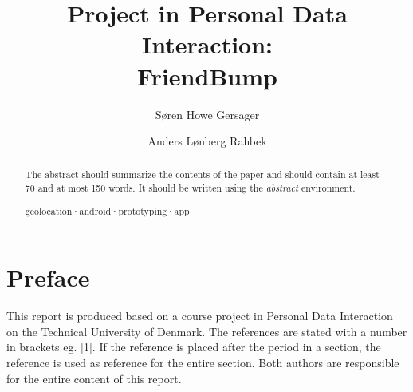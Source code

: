 \documentclass[runningheads,a4paper]{llncs}
\newcommand{\keywords}[1]{\par\addvspace\baselineskip
\noindent\keywordname\enspace\ignorespaces#1}
\begin{document}
\mainmatter  %

\title{Project in Personal Data Interaction:\\FriendBump}


%
%
\author{S\o ren Howe Gersager \and Anders L\o nberg Rahbek}
%


%
%

\maketitle


\begin{abstract}
The abstract should summarize the contents of the paper and should
contain at least 70 and at most 150 words. It should be written using the
\emph{abstract} environment.
\keywords{geolocation·android·prototyping·app}
\end{abstract}


\section*{Preface}
This report is produced based on a course project in Personal Data Interaction on the Technical University of Denmark. The references are stated with a number in brackets eg. [1]. If the reference is placed after the period in a section, the reference is used as reference for the entire section. 
Both authors are responsible for the entire content of this report.
\end{document}
